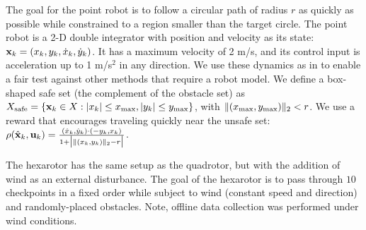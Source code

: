 The goal for the point robot is to follow a circular path of radius $r$ as quickly as possible while constrained to a region smaller than the target circle.
The point robot is a 2-D double integrator with position and velocity as its state: ${\mathbf{x}}_k = (x_k,y_k,\dot{x}_k,\dot{y}_k)$.
It has a maximum velocity of 2 m/s, and its control input is acceleration up to 1 m/s$^2$ in any direction.
We use these dynamics as in \cite{achiam2017constrained,wagener2021safe} to enable a fair test against other methods that require a robot model.
We define a box-shaped safe set (the complement of the obstacle set) as $X_{\mathrm{\textnormal{safe}}} = \{{\mathbf{x}}_k \in X : |x_k| \le x_{\max},  |y_k| \le y_{\max}\}$, with $\lVert(x_{\max}, y_{\max})\rVert_2 < r$.
We use a reward that encourages traveling quickly near the unsafe set: $\rho (\hat{{\mathbf{x}}}_k,{\mathbf{u}}_k) = \frac{(\dot{x}_k, \dot{y}_k) \cdot (-y_k, x_k)}{1 + \big| \lVert(x_k, y_k)\rVert_2 - r\big|}$.

The hexarotor has the same setup as the quadrotor, but with the addition of wind as an external disturbance.
The goal of the hexarotor is to pass through $10$ checkpoints in a fixed order while subject to wind (constant speed and direction) and randomly-placed obstacles.
Note, offline data collection was performed under wind conditions.



